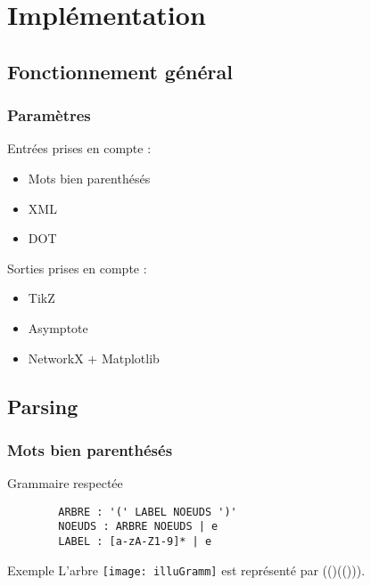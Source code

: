 \section{Implémentation}

\subsection{Fonctionnement général}

\begin{frame}
    \frametitle{Paramètres}
    Entrées prises en compte :
    \begin{itemize}
        \item Mots bien parenthésés
        \item XML
        \item DOT %
    \end{itemize}
    Sorties prises en compte :
    \begin{itemize}
        \item TikZ %
        \item Asymptote %
        \item NetworkX + Matplotlib %
    \end{itemize}
\end{frame}

\subsection{Parsing}

\begin{frame}[fragile]
    \frametitle{Mots bien parenthésés}
    \begin{block}{Grammaire respectée}
    \begin{verbatim}
        ARBRE : '(' LABEL NOEUDS ')'
        NOEUDS : ARBRE NOEUDS | e
        LABEL : [a-zA-Z1-9]* | e
    \end{verbatim}
    \end{block}
    \begin{exampleblock}{Exemple}
    L'arbre \texttt{[image: illuGramm]} est représenté par (()(())).
    \end{exampleblock}
\end{frame}

